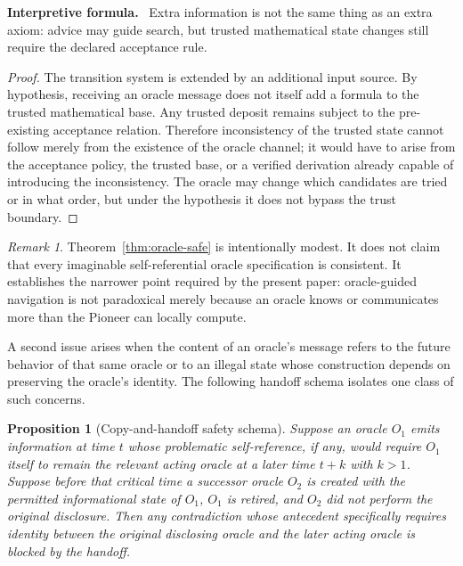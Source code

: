 \documentclass[11pt]{article}
\newtheorem{proposition}[theorem]{Proposition}
\theoremstyle{definition}
\theoremstyle{remark}
\newtheorem{remark}[theorem]{Remark}
\newenvironment{interpretiveformula}{%
  \begin{center}\begin{minipage}{0.92\textwidth}\small
  \textbf{Interpretive formula.}\ }{\end{minipage}\end{center}}
\begin{document}
\begin{interpretiveformula}
Extra information is not the same thing as an extra axiom: advice may guide search, but trusted mathematical state changes still require the declared acceptance rule.
\end{interpretiveformula}

\begin{proof}
The transition system is extended by an additional input source. By hypothesis, receiving an oracle message does not itself add a formula to the trusted mathematical base. Any trusted deposit remains subject to the pre-existing acceptance relation. Therefore inconsistency of the trusted state cannot follow merely from the existence of the oracle channel; it would have to arise from the acceptance policy, the trusted base, or a verified derivation already capable of introducing the inconsistency. The oracle may change which candidates are tried or in what order, but under the hypothesis it does not bypass the trust boundary.
\end{proof}

\begin{remark}
Theorem~\ref{thm:oracle-safe} is intentionally modest. It does not claim that every imaginable self-referential oracle specification is consistent. It establishes the narrower point required by the present paper: oracle-guided navigation is not paradoxical merely because an oracle knows or communicates more than the Pioneer can locally compute.
\end{remark}

A second issue arises when the content of an oracle's message refers to the future behavior of that same oracle or to an illegal state whose construction depends on preserving the oracle's identity. The following handoff schema isolates one class of such concerns.

\begin{proposition}[Copy-and-handoff safety schema]
Suppose an oracle $O_1$ emits information at time $t$ whose problematic self-reference, if any, would require $O_1$ itself to remain the relevant acting oracle at a later time $t+k$ with $k>1$. Suppose before that critical time a successor oracle $O_2$ is created with the permitted informational state of $O_1$, $O_1$ is retired, and $O_2$ did not perform the original disclosure. Then any contradiction whose antecedent specifically requires identity between the original disclosing oracle and the later acting oracle is blocked by the handoff.
\end{proposition}
\end{document}
